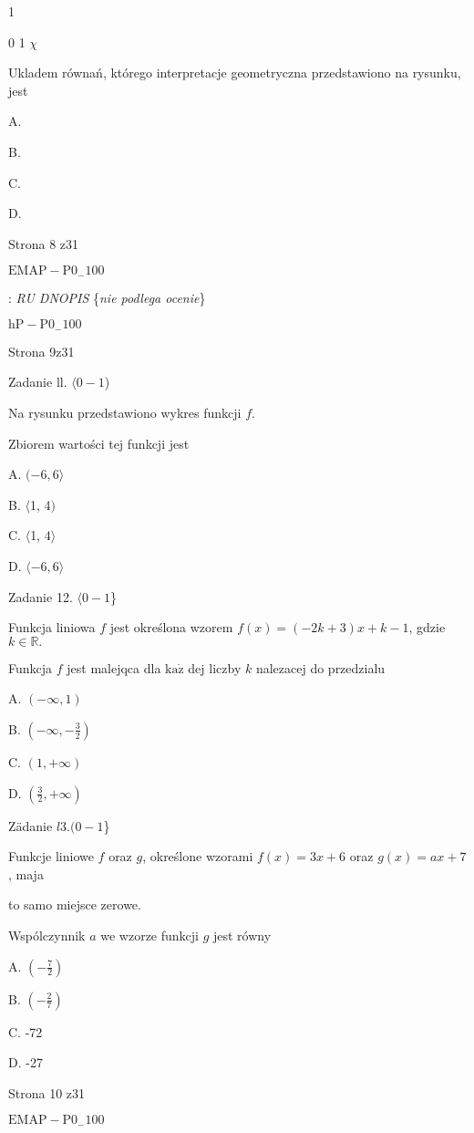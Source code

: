 \documentclass[a4paper,12pt]{article}
\begin{document}
1

0  1  $\chi$

Ukladem równań, którego interpretacje geometryczna przedstawiono na rysunku, jest

A. 

B. 

C. 

D. 

Strona 8 z31

$\mathrm{E}\mathrm{M}\mathrm{A}\mathrm{P}-\mathrm{P}0_{-}100$





: {\it RU DNOPIS} \{{\it nie podlega ocenie}\}

$\mathrm{h}\mathrm{P}-\mathrm{P}0_{-}100$

Strona 9z31





Zadanie ll. $\langle 0-1$)

Na rysunku przedstawiono wykres funkcji $f.$

Zbiorem wartości tej funkcji jest

A. $(-6,6\rangle$

B. $\langle$1, 4$)$

C. $\langle$1, $ 4\rangle$

D. $\langle-6,  6\rangle$

Zadanie 12. $\langle 0-1$\}

Funkcja liniowa $f$ jest określona wzorem $f(x)=(-2k+3)x+k-1$, gdzie $k\in \mathbb{R}.$

Funkcja $f$ jest malejqca dla $\mathrm{k}\mathrm{a}\dot{\mathrm{z}}$ dej liczby $k$ nalezacej do przedzialu

A. $(-\infty,1)$

B. $(-\displaystyle \infty,-\frac{3}{2})$

C. $(1,+\infty)$

D. $(\displaystyle \frac{3}{2},+\infty)$

Zädanie $l3. (0-1$\}

Funkcje liniowe $f$ oraz $g$, określone wzorami $f(x)=3x+6$ oraz $g(x)=ax+7$, maja

to samo miejsce zerowe.

Wspólczynnik $a$ we wzorze funkcji $g$ jest równy

A. $(-\displaystyle \frac{7}{2})$

B. $(-\displaystyle \frac{2}{7})$

C. -72

D. -27

Strona 10 z31

$\mathrm{E}\mathrm{M}\mathrm{A}\mathrm{P}-\mathrm{P}0_{-}100$
\end{document}
